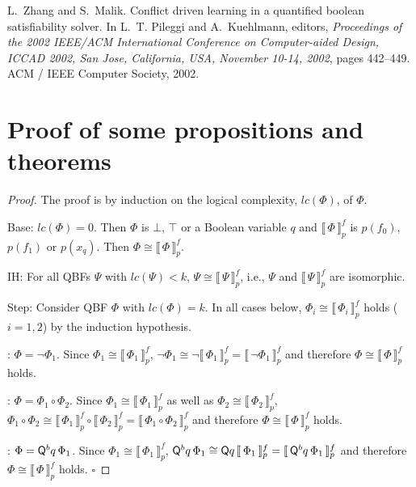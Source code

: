 \documentclass{llncs}
\newcommand{\base}{{\sf Base}}
\newcommand{\ih}{{\sf IH}}
\newcommand{\step}{{\sf Step}}
\newcommand{\sccase}[1]{\noindent {\sc Case~#1}}
\newcommand{\quantifier}{{\sf Q}}
\newcommand{\falsum}{\bot}
\newcommand{\verum}{\top}
\newcommand{\lc}[1]{\mathit{lc}(#1)}
\newcommand{\QBFtoPL}[3]{\llbracket\,#1\,\rrbracket_{#2}^{#3}}
\renewcommand{\qed}{\hfill\ensuremath{\square}}
\begin{document}
\begin{thebibliography}{10}
L.~Zhang and S.~Malik.
\newblock Conflict driven learning in a quantified boolean satisfiability
  solver.
\newblock In L.~T. Pileggi and A.~Kuehlmann, editors, {\em Proceedings of the
  2002 {IEEE/ACM} International Conference on Computer-aided Design, {ICCAD}
  2002, San Jose, California, USA, November 10-14, 2002}, pages 442--449. {ACM}
  / {IEEE} Computer Society, 2002.

\end{thebibliography}





\newpage
\appendix

\section{Proof of some propositions and theorems}

\QBFIsomorphic*


\begin{proof}
The proof is by induction on the logical complexity,
$\lc{\Phi}$, of $\Phi$.

\medskip
\noindent
\base: $\lc{\Phi} = 0$. Then $\Phi$ is $\falsum$, $\verum$ or a Boolean
variable $q$ and $\QBFtoPL{\Phi}{p}{f}$ is $p(f_{0})$,  
$p(f_{1})$ or $p(x_q)$. Then $\Phi \cong \QBFtoPL{\Phi}{p}{f}$.

\medskip
\noindent
\ih: For all QBFs $\Psi$ with $\lc{\Psi} < k$, $\Psi\cong
\QBFtoPL{\Psi}{p}{f}$, i.e., $\Psi$ and $\QBFtoPL{\Psi}{p}{f}$ are isomorphic.

\medskip
\noindent
\step: Consider QBF $\Phi$ with $\lc{\Phi}=k$. In all cases below, 
$\Phi_i\cong \QBFtoPL{\Phi_i}{p}{f}$ holds
($i=1,2$) by the induction hypothesis.

\medskip
\noindent
\sccase{1}: $\Phi = \neg \Phi_1$. Since $\Phi_1 \cong \QBFtoPL{\Phi_1}{p}{f}$,
$\neg \Phi_1 \cong \neg \QBFtoPL{\Phi_1}{p}{f} = \QBFtoPL{\neg \Phi_1}{p}{f}$
and therefore $\Phi \cong \QBFtoPL{\Phi}{p}{f}$ holds.

\medskip
\noindent
\sccase{2}: $\Phi = \Phi_1 \circ \Phi_2$. Since $\Phi_1\cong
\QBFtoPL{\Phi_1}{p}{f}$ as well as $\Phi_2 \cong \QBFtoPL{\Phi_2}{p}{f}$,
$\Phi_1\circ \Phi_2 \cong \QBFtoPL{\Phi_1}{p}{f} \circ \QBFtoPL{\Phi_2}{p}{f}
= \QBFtoPL{\Phi_1\circ \Phi_2}{p}{f}$ and therefore $\Phi \cong
\QBFtoPL{\Phi}{p}{f}$ holds.

\medskip
\noindent
\sccase{3}: $\Phi = \quantifier^b q \, \Phi_1$. Since $\Phi_1 \cong
\QBFtoPL{\Phi_1}{p}{f}$, $\quantifier^b q\, \Phi_1 \cong \quantifier q\,
\QBFtoPL{\Phi_1}{p}{f} = \QBFtoPL{\quantifier^b q\, \Phi_1}{p}{f}$ and
therefore $\Phi \cong \QBFtoPL{\Phi}{p}{f}$ holds.
\qed
\end{proof}
\end{document}
